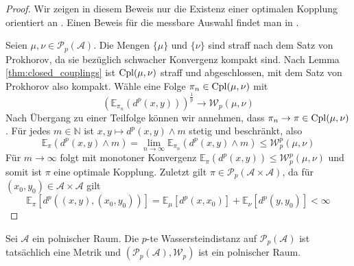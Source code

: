 \begin{proof}
    Wir zeigen in diesem Beweis nur die Existenz einer optimalen Kopplung orientiert an \cite[Satz 4.1]{villani}. Einen Beweis für die messbare Auswahl findet man in \cite[Korollar 5.22]{villani}. 
    
    Seien $\mu, \nu \in \mathcal{P}_p(\mathcal{A})$. Die Mengen $\{\mu\}$ und $\{\nu\}$ sind straff nach dem Satz von Prokhorov, da sie bezüglich schwacher Konvergenz kompakt sind. Nach Lemma \ref{thm:closed_couplings} ist $\operatorname{Cpl}(\mu, \nu)$ straff und abgeschlossen, mit dem Satz von Prokhorov also kompakt. Wähle eine Folge $\pi_n\in \operatorname{Cpl}(\mu, \nu)$ mit 
    $$\left(\mathbb{E}_{\pi_n}(d^p(x,y))\right)^{\frac{1}{p}} \rightarrow \mathcal{W}_p(\mu, \nu)$$
    Nach Übergang zu einer Teilfolge können wir annehmen, dass $\pi_n \rightarrow \pi \in \operatorname{Cpl}(\mu, \nu)$. Für jedes $m \in \mathbb{N}$ ist $x,y\mapsto d^p(x,y)\wedge m$ stetig und beschränkt, also 
    $$\mathbb{E}_\pi(d^p(x,y)\wedge m) = \lim_{n\rightarrow \infty} \mathbb{E}_{\pi_n}(d^p(x,y) \wedge m) \leq \mathcal{W}_p^p(\mu, \nu)$$
    Für $m \rightarrow \infty$ folgt mit monotoner Konvergenz $\mathbb{E}_\pi(d^p(x,y))\leq \mathcal{W}_p^p(\mu, \nu)$ und somit ist $\pi$ eine optimale Kopplung. Zuletzt gilt $\pi \in \mathcal{P}_p(\mathcal{A}\times \mathcal{A})$, da für $(x_0, y_0) \in \mathcal{A}\times \mathcal{A}$ gilt 
    $$\mathbb{E}_{\pi}\left[d^p\left((x,y), (x_0,y_0)\right)\right] = \mathbb{E}_\mu\left[d^p(x,x_0)\right] + \mathbb{E}_\nu\left[d^p(y,y_0)\right] < \infty$$
\end{proof}
\begin{lemma}\label{thm:pp_is_polish}
    Sei $\mathcal{A}$ ein polnischer Raum. Die $p$-te Wassersteindistanz auf $\mathcal{P}_p(\mathcal{A})$ ist tatsächlich eine Metrik und $(\mathcal{P}_p(\mathcal{A}), \mathcal{W}_p)$ ist ein polnischer Raum.
\end{lemma}
